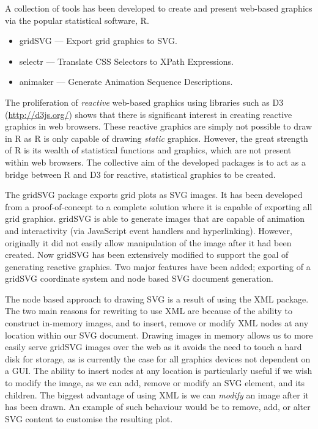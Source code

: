\documentclass[11pt, a4paper]{article}
\title{\doctitle{}}
\author{\docauthor{} \\ \url{simon.potter@auckland.ac.nz}}
\date{\docdate{}}
\newcommand{\grid}{\textsf{grid}}
\newcommand{\R}{\textsf{R}}
\newcommand{\gridSVG}{\textsf{gridSVG}}
\newcommand{\JS}{\textsf{JavaScript}}
\newcommand{\pkg}[1]{\textsf{#1}}
\newcommand{\tsc}[1]{{\small \textsc{#1}}}
\begin{document}
\maketitle

A collection of tools has been developed to create and present
web-based graphics via the popular statistical software, \R{}.

\begin{itemize}
  \item \gridSVG{} --- Export \grid{} graphics to \tsc{SVG}.
  \item \pkg{selectr} --- Translate CSS Selectors to XPath Expressions.
  \item \pkg{animaker} --- Generate Animation Sequence Descriptions.
\end{itemize}

The proliferation of \emph{reactive} web-based graphics using
libraries such as D3 (\url{http://d3js.org/}) shows that there is
significant interest in creating reactive graphics in web
browsers. These reactive graphics are simply not possible to draw in R
as R is only capable of drawing \emph{static} graphics. However, the
great strength of R is its wealth of statistical functions and
graphics, which are not present within web browsers. The collective
aim of the developed packages is to act as a bridge between R and D3
for reactive, statistical graphics to be created.

The \gridSVG{} package exports \pkg{grid} plots as \tsc{SVG}
images. It has been developed from a proof-of-concept to a complete
solution where it is capable of exporting all \grid{}
graphics. \gridSVG{} is able to generate images that are capable of
animation and interactivity (via \JS{} event handlers and
hyperlinking). However, originally it did not easily allow
manipulation of the image after it had been created. Now \pkg{gridSVG}
has been extensively modified to support the goal of generating
reactive graphics. Two major features have been added; exporting of a
\gridSVG{} coordinate system and node based \tsc{SVG} document
generation.

The node based approach to drawing \tsc{SVG} is a result of using the
\pkg{XML} package. The two main reasons for rewriting to use \pkg{XML}
are because of the ability to construct in-memory images, and to
insert, remove or modify \tsc{XML} nodes at any location within our
\tsc{SVG} document. Drawing images in memory allows us to more easily
serve \gridSVG{} images over the web as it avoids the need to touch a
hard disk for storage, as is currently the case for all graphics
devices not dependent on a GUI. The ability to insert nodes at any
location is particularly useful if we wish to modify the image, as we
can add, remove or modify an \tsc{SVG} element, and its children. The
biggest advantage of using \pkg{XML} is we can \emph{modify} an image
after it has been drawn. An example of such behaviour would be to
remove, add, or alter \tsc{SVG} content to customise the resulting
plot.
\end{document}
